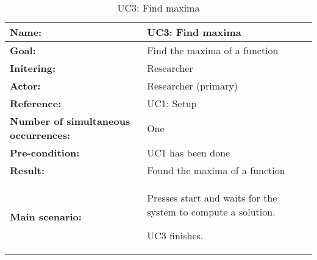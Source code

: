 \begin{table}[H]
	\begin{tabularx}{\textwidth}{| >{\raggedright\arraybackslash}p{3.3 cm} | >{\raggedright\arraybackslash}X |} \hline
		
		\textbf{Name:} 						& UC3: Find maxima\\ \hline
		\textbf{Goal:}						& Find the maxima of a function \\ \hline
		\textbf{Initering:}					& Researcher \\ \hline
		\textbf{Actor:} 					& Researcher (primary) \\ \hline
		\textbf{Reference:} 				& UC1: Setup \\ \hline
		\textbf{Number of simultaneous occurrences:} & One \\ \hline
		\textbf{Pre-condition:} 				& UC1 has been done \\ \hline
		\textbf{Result:}					& Found the maxima of a function \\ \hline
		\textbf{Main scenario:}				& 		

		\begin{packed_enum}
	\item Presses start and waits for the system to compute a solution.
	\item UC3 finishes.
\end{packed_enum} \\ \hline
	\end{tabularx}
\caption{UC3: Find maxima}
\label{tbl:uc3}
\end{table}